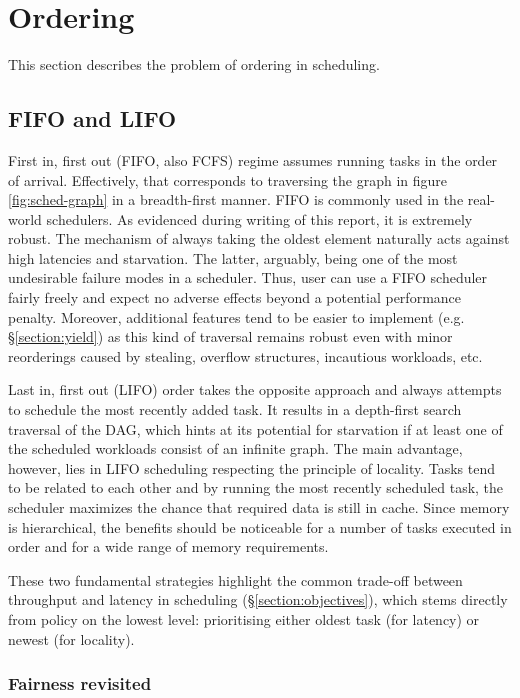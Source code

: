 \documentclass[12pt,a4paper,twoside]{report}
\begin{document}
\section{Ordering}
\label{section:approaches}
This section describes the problem of ordering in scheduling.

\subsection{FIFO and LIFO}
\label{section:ordering}
First in, first out (FIFO, also FCFS) regime assumes running tasks in the order of arrival. Effectively, that corresponds to traversing the graph in figure \ref{fig:sched-graph} in a breadth-first manner. FIFO is commonly used in the real-world schedulers. As evidenced during writing of this report, it is extremely robust. The mechanism of always taking the oldest element naturally acts against high latencies and starvation. The latter, arguably, being one of the most undesirable failure modes in a scheduler. Thus, user can use a FIFO scheduler fairly freely and expect no adverse effects beyond a potential performance penalty. Moreover, additional features tend to be easier to implement (e.g. \S\ref{section:yield}) as this kind of traversal remains robust even with minor reorderings caused by stealing, overflow structures, incautious workloads, etc.

Last in, first out (LIFO) order takes the opposite approach and always attempts to schedule the most recently added task. It results in a depth-first search traversal of the DAG, which hints at its potential for starvation if at least one of the scheduled workloads consist of an infinite graph. The main advantage, however, lies in LIFO scheduling respecting the principle of locality. Tasks tend to be related to each other and by running the most recently scheduled task, the scheduler maximizes the chance that required data is still in cache. Since memory is hierarchical, the benefits should be noticeable for a number of tasks executed in order and for a wide range of memory requirements. 

These two fundamental strategies highlight the common trade-off between throughput and latency in scheduling (\S\ref{section:objectives}), which stems directly from policy on the lowest level: prioritising either oldest task (for latency) or newest (for locality). 


\subsubsection{Fairness revisited}
\label{section:fairness-revisited}
\end{document}
